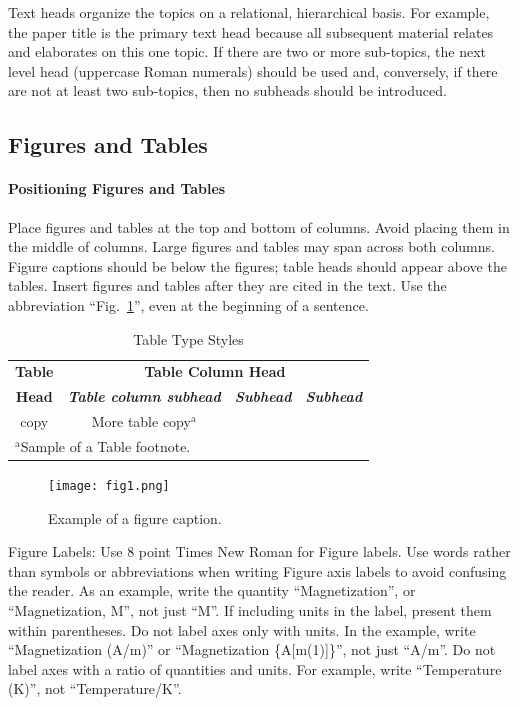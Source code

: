 \documentclass[conference]{IEEEtran}
\begin{document}
Text heads organize the topics on a relational, hierarchical basis. For 
example, the paper title is the primary text head because all subsequent 
material relates and elaborates on this one topic. If there are two or more 
sub-topics, the next level head (uppercase Roman numerals) should be used 
and, conversely, if there are not at least two sub-topics, then no subheads 
should be introduced.

\subsection{Figures and Tables}
\paragraph{Positioning Figures and Tables} Place figures and tables at the top and 
bottom of columns. Avoid placing them in the middle of columns. Large 
figures and tables may span across both columns. Figure captions should be 
below the figures; table heads should appear above the tables. Insert 
figures and tables after they are cited in the text. Use the abbreviation 
``Fig.~\ref{fig}'', even at the beginning of a sentence.

\begin{table}[htbp]
\caption{Table Type Styles}
\begin{center}
\begin{tabular}{|c|c|c|c|}
\hline
\textbf{Table}&\multicolumn{3}{|c|}{\textbf{Table Column Head}} \\
\cline{2-4} 
\textbf{Head} & \textbf{\textit{Table column subhead}}& \textbf{\textit{Subhead}}& \textbf{\textit{Subhead}} \\
\hline
copy& More table copy$^{\mathrm{a}}$& &  \\
\hline
\multicolumn{4}{l}{$^{\mathrm{a}}$Sample of a Table footnote.}
\end{tabular}
\label{tab1}
\end{center}
\end{table}

\begin{figure}[htbp]
\centerline{\texttt{[image: fig1.png]}}
\caption{Example of a figure caption.}
\label{fig}
\end{figure}

Figure Labels: Use 8 point Times New Roman for Figure labels. Use words 
rather than symbols or abbreviations when writing Figure axis labels to 
avoid confusing the reader. As an example, write the quantity 
``Magnetization'', or ``Magnetization, M'', not just ``M''. If including 
units in the label, present them within parentheses. Do not label axes only 
with units. In the example, write ``Magnetization (A/m)'' or ``Magnetization 
\{A[m(1)]\}'', not just ``A/m''. Do not label axes with a ratio of 
quantities and units. For example, write ``Temperature (K)'', not 
``Temperature/K''.
\end{document}
